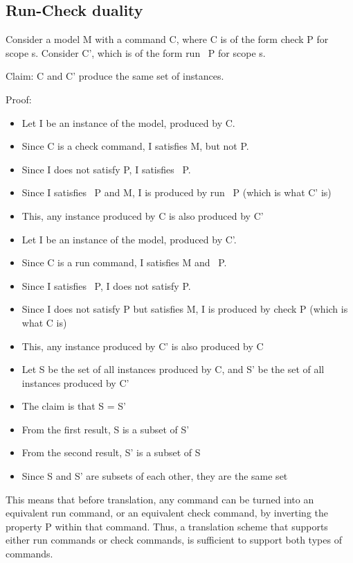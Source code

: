\subsection{Run-Check duality}

Consider a model M with a command C, where C is of the form check P for scope s. Consider C', which is of the form run ~P for scope s. 

Claim: C and C' produce the same set of instances.

Proof:

\begin{itemize}
  \item Let I be an instance of the model, produced by C.
  \item Since C is a check command, I satisfies M, but not P.
  \item Since I does not satisfy P, I satisfies ~P.
  \item Since I satisfies ~P and M, I is produced by run ~P (which is what C' is)
  \item This, any instance produced by C is also produced by C'
\end{itemize}


\begin{itemize}
  \item Let I be an instance of the model, produced by C'.
  \item Since C is a run command, I satisfies M and ~P.
  \item Since I satisfies ~P, I does not satisfy P.
  \item Since I does not satisfy P but satisfies M, I is produced by check P (which is what C is)
  \item This, any instance produced by C' is also produced by C
\end{itemize}


\begin{itemize}
  \item Let S be the set of all instances produced by C, and S' be the set of all instances produced by C'
  \item The claim is that S = S'
  \item From the first result, S is a subset of S'
  \item From the second result, S' is a subset of S
  \item Since S and S' are subsets of each other, they are the same set
\end{itemize}

This means that before translation, any command can be turned into an equivalent run command, or an equivalent check command, by inverting the property P within that command. Thus, a translation scheme that supports either run commands or check commands, is sufficient to support both types of commands.





